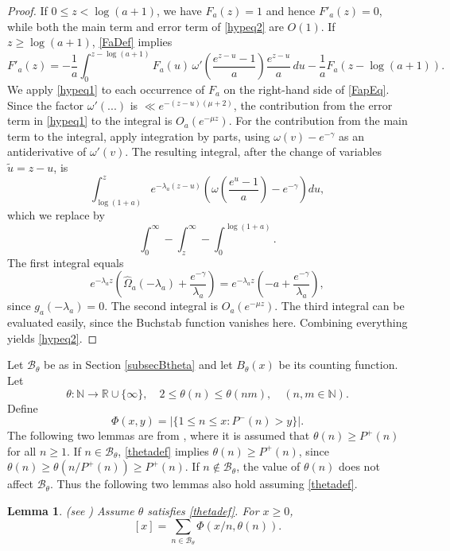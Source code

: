 \documentclass[11pt]{amsart}
\newtheorem{lemma}{Lemma}
\begin{document}
\begin{proof}
If $0\le z < \log(a+1)$, we have $F_a(z)=1$ and hence $F'_a(z)=0$, while both the main term and error term of \eqref{hypeq2} are $O(1)$.
If $z\ge \log(a+1)$, \eqref{FaDef} implies
\begin{equation}\label{FapEq}
F'_a(z)= -\frac{1}{a} \int_0^{z-\log(a+1)} F_a(u) \, \omega'\left(\frac{e^{z-u}-1}{a}\right)  \frac{e^{z-u}}{a} \, d u 
 -\frac{1}{a} F_a(z-\log(a+1)).
\end{equation}
We apply \eqref{hypeq1} to each occurrence of $F_a$ on the right-hand side of \eqref{FapEq}.
Since the factor $\omega'(...)$ is $ \ll e^{-(z-u)(\mu+2)}$, the contribution from the error term in \eqref{hypeq1} to the integral is $O_a(e^{-\mu z})$.
For the contribution from the main term to the integral, apply integration by parts, using $\omega(v)-e^{-\gamma}$ as an antiderivative of $\omega'(v)$. 
The resulting integral, after the change of variables $\tilde{u}=z-u$, is 
$$
\int_{\log(1+a)}^z e^{-\lambda_a (z-u)} \left(\omega\left(\frac{e^u -1}{a}\right) - e^{-\gamma} \right) du,
$$
which we replace by 
$$\int_0^\infty - \int_z^\infty - \int_0^{\log(1+a)}.$$
The first integral equals
$$
e^{-\lambda_a z} \left(\widehat{\Omega}_a(-\lambda_a) + \frac{e^{-\gamma}}{\lambda_a}\right) =e^{-\lambda_a z} \left(-a + \frac{e^{-\gamma}}{\lambda_a}\right),
$$
since $g_a(-\lambda_a)=0$. The second integral is $O_a(e^{-\mu z})$. The third integral can be evaluated easily, since the Buchstab function vanishes here.
Combining everything yields \eqref{hypeq2}.
\end{proof}

 

Let $\mathcal{B}_\theta$ be as in Section \ref{subsecBtheta} and let $B_\theta(x)$ be its counting function. Let
\begin{equation}\label{thetadef}
\theta: \mathbb{N}\to \mathbb{R}\cup \{\infty\}, \quad 2\le \theta(n)\le \theta(nm) ,\quad (n,m \in \mathbb{N}).
\end{equation} 
Define
$$
\Phi(x,y) = |\{1\le n\le x: P^-(n)>y\}|.
$$
The following two lemmas are from \cite{SPA}, where it is assumed that $\theta(n) \ge P^+(n)$ for all $n\ge 1$. 
If  $n\in \mathcal{B}_\theta$, \eqref{thetadef} implies $\theta(n)\ge P^+(n)$, since 
$\theta(n) \ge \theta(n/P^+(n)) \ge P^+(n). $ If $n \notin \mathcal{B}_\theta$, the value of $\theta(n)$ does not affect $\mathcal{B}_\theta$. 
Thus the following two lemmas also hold assuming \eqref{thetadef}.

\begin{lemma}\label{Lem1}(see \cite[Lemma 3]{SPA})
Assume $\theta$ satisfies \eqref{thetadef}. For $x\ge 0$, 
$$
[x] = \sum_{n \in \mathcal{B}_\theta} \Phi(x/n, \theta(n)).
$$
\end{lemma}
\end{document}
